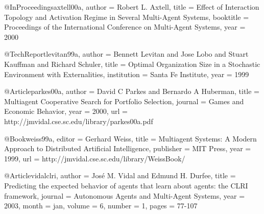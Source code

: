 @InProceedings{axtell00a,
  author =   {Robert L. Axtell},
  title =    {Effect of Interaction Topology and Activation Regime
                  in Several Multi-Agent Systems},
  booktitle =    {Proceedings of the International Conference on
                  Multi-Agent Systems},
  year =     2000
}

@TechReport{levitan99a,
  author =   {Bennett Levitan and Jose Lobo and Stuart Kauffman
                  and Richard Schuler},
  title =    {Optimal Organization Size in a Stochastic
                  Environment with Externalities},
  institution =  {Santa Fe Institute},
  year =     1999
}

@Article{parkes00a,
  author =   {David C Parkes and Bernardo A Huberman},
  title =    {Multiagent Cooperative Search for Portfolio
                  Selection},
  journal =  {Games and Economic Behavior},
  year =     2000,
  url =      {http://jmvidal.cse.sc.edu/library/parkes00a.pdf}
}

@Book{weiss99a,
  editor =   {Gerhard Weiss},
  title =    {Multiagent Systems: A Modern Approach to Distributed
                  Artificial Intelligence},
  publisher =    {{MIT} Press},
  year =     1999,
  url =      {http://jmvidal.cse.sc.edu/library/WeissBook/}
}

@Article{vidalclri,
  author =   {Jos\'{e} M. Vidal and Edmund H. Durfee},
  title =    {Predicting the expected behavior of agents that
                  learn about agents: the {CLRI} framework},
  journal =      {Autonomous Agents and Multi-Agent Systems},
  year =     2003,
  month =    jan,
  volume =   6,
  number =   1,
  pages =    {77-107}
}
